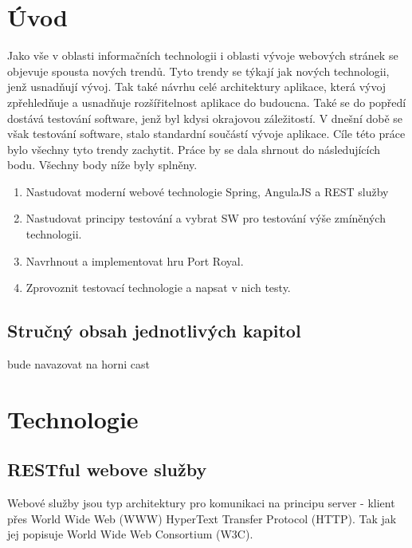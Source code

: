 \documentclass[czech,master,public,dept460,male,cpdeclaration,twoside]{diploma}
\begin{document}
\MakeTitlePages

\lstlistoflistings

\section{Úvod}
Jako vše v oblasti informačních technologii i oblasti vývoje webových stránek se objevuje spousta nových trendů. Tyto trendy se týkají jak nových technologii, jenž usnadňují vývoj. Tak také návrhu celé architektury aplikace, která vývoj zpřehledňuje a usnadňuje rozšířitelnost aplikace do budoucna. Také se do popředí dostává testování software, jenž byl kdysi okrajovou záležitostí. V dnešní době se však testování software, stalo standardní součástí vývoje aplikace. Cíle této práce bylo všechny tyto trendy zachytit. Práce by se dala shrnout do následujících bodu. Všechny body níže byly splněny.

\begin{enumerate}
	\item Nastudovat moderní webové technologie Spring, AngulaJS a REST služby
	\item Nastudovat principy testování a vybrat SW pro testování výše zmíněných technologii.
	\item Navrhnout a implementovat hru Port Royal.
	\item Zprovoznit testovací technologie a napsat v nich testy.
\end{enumerate}

\subsection{Stručný obsah jednotlivých kapitol}
bude navazovat na horni cast

\section{Technologie}

\subsection{RESTful webove služby}
Webové služby jsou typ architektury pro komunikaci na principu server - klient přes World Wide Web (WWW) HyperText Transfer Protocol (HTTP). Tak jak jej popisuje World Wide Web Consortium (W3C). \cite{WebServices}
\end{document}
